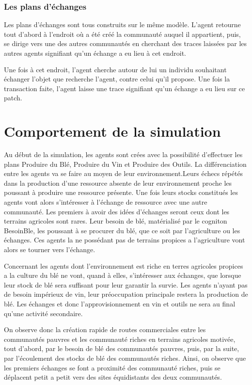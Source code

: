 \documentclass[a4paper,oneside,12 pt]{article}
\begin{document}
\subsubsection{Les plans d'échanges}
	Les plans d'échanges sont tous construits sur le même modèle. L'agent retourne tout d'abord à l'endroit où a été créé la communauté auquel il appartient, puis, se dirige vers une des autres communautés en cherchant des traces laissées par les autres agents signifiant qu'un échange a eu lieu à cet endroit. 
	
	Une fois à cet endroit, l'agent cherche autour de lui un individu souhaitant échanger l'objet que recherche l'agent, contre celui qu'il propose. Une fois la transaction faite, l'agent laisse une trace signifiant qu'un échange a eu lieu sur ce patch.

\clearpage
\section{Comportement de la simulation}
	Au début de la simulation, les agents sont crées avec la possibilité d'effectuer les plans Produire du Blé, Produire du Vin et Produire des Outils. La différenciation entre les agents va se faire au moyen de leur environnement.Leurs échecs répétés dans la production d'une ressource absente de leur environnement proche les poussant à produire une ressource présente. Une fois leurs stocks constitués les agents vont alors s'intéresser à l'échange de ressource avec une autre communauté. Les premiers à avoir des idées d'échanges seront ceux dont les terrains agricoles sont rares. Leur besoin de blé, matérialisé par le cogniton BesoinBle, les poussant à se procurer du blé, que ce soit par l'agriculture ou les échanges. Ces agents la ne possédant pas de terrains propices a l'agriculture vont alors se tourner vers l'échange. 
	
	Concernant les agents dont l'environnement est riche en terres agricoles propices a la culture du blé ne vont, quand à elles, s'intéresser aux échanges, que lorsque leur stock de blé sera suffisant pour leur garantir la survie. Les agents n'ayant pas de besoin impérieux de vin, leur préoccupation principale restera la production de blé. Les échanges et donc l'approvisionnement en vin et outils ne sera au final qu'une activité secondaire.
	
	On observe donc la création rapide de routes commerciales entre les communautés pauvres et les communauté riches en terrains agricoles motivée, tout d'abord, par le besoin de blé des communautés pauvres, puis, par la suite, par l'écoulement des stocks de blé des communautés riches. Ainsi, on observe que les premiers échanges se font a proximité des communauté riches, puis se déplacent petit a petit vers des sites équidistants des deux communautés.
\end{document}
